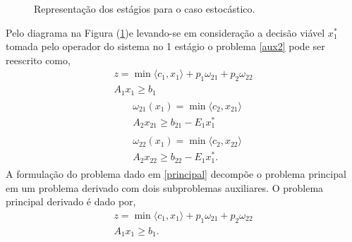 \begin{figure}[!h]
 \centering
\caption{Representa\c c\~ao dos est\'agios para o caso estoc\'astico.}
 \label{estocastico}
\end{figure}
Pelo diagrama na Figura (\ref{estocastico})e levando-se em considera\c c\~ao a decis\~ao vi\'avel $x_1^{*}$ tomada pelo
operador do sistema no 1 est\'agio o problema \ref {aux2} pode ser reescrito como,
{\setlength{\belowdisplayskip}{-4pt}
\begin{align*}
  z = \min  \langle c_1,x_1\rangle + p_1{\omega}_{21} + p_2 {\omega}_{22} \nonumber \\	
	A_1 x_1 \geq b_1
  \end{align*}}%
{\setlength{\abovedisplayskip}{-6pt}
 \setlength{\belowdisplayskip}{0pt}
\begin{align}
	\label{principal}
  \begin{split}	
  &\omega_{21}(x_1) =\min \langle c_2,x_{21}\rangle \\
  & A_2 x_{21} \geq b_{21} - E_1 x_1^{*} 
  \end{split}
	\end{align}}%
{\setlength{\abovedisplayskip}{0pt}
\begin{align}
  \begin{split}	
 	&\omega_{22}(x_1) = \min  \langle c_2,x_{22}\rangle \\ \nonumber
	&A_2x_{22} \geq b_{22} - E_1 x_1^{*}. 
  \end{split}
   \end{align}}%
A formula\c c\~ao do problema dado em \ref{principal} decomp\~oe o problema principal em um problema derivado com dois
subproblemas auxiliares. O problema principal derivado \'e dado por,
\begin{align}
	\label{estoPrincipal}
  z = \min  \langle c_1,x_1\rangle + p_1{\omega}_{21} + p_2 {\omega}_{22} \nonumber \\	
	A_1 x_1 \geq b_1.
\end{align}
